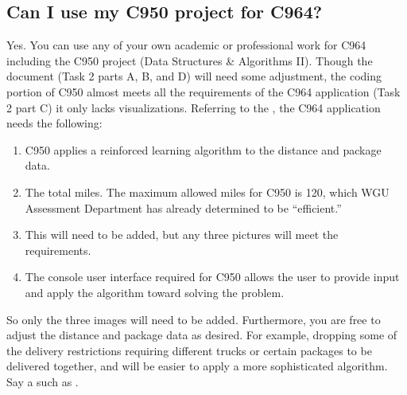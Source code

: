 \documentclass[letterpaper,10pt,english]{jupyterBook}
\begin{document}
\subsection{Can I use my C950 project for C964?}
\label{\detokenize{task2_c/task2_part_c:can-i-use-my-c950-project-for-c964}}
\sphinxAtStartPar
Yes. You can use any of your own academic or professional work for C964 including the C950 project (Data Structures \& Algorithms II). Though the document (Task 2 parts A, B, and D) will need some adjustment, the coding portion of C950 almost meets all the requirements of the C964 application (Task 2 part C) \sphinxhyphen{}it only lacks visualizations. Referring to the , the C964 application needs the following:
\begin{enumerate}
%
\item {} 
\sphinxAtStartPar
{} C950 applies a reinforced learning algorithm to the distance and package data.

\item {} 
\sphinxAtStartPar
{} The total miles. The maximum allowed miles for C950 is 120, which WGU Assessment Department has already determined to be “efficient.”

\item {} 
\sphinxAtStartPar
{} This will need to be added, but any three pictures will meet the requirements.

\item {} 
\sphinxAtStartPar
{} The console user interface required for C950 allows the user to provide input and apply the algorithm toward solving the problem.

\end{enumerate}

\sphinxAtStartPar
So only the three images will need to be added. Furthermore, you are free to adjust the distance and package data as desired. For example, dropping some of the delivery restrictions requiring different trucks or certain packages to be delivered together, and will be easier to apply a more sophisticated algorithm. Say a  such as .
\end{document}
